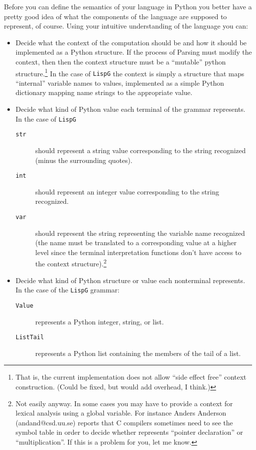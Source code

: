 Before you can define the semantics of your language
in Python you better have a pretty good idea of what
the components of the language are supposed to represent,
of course.  Using your intuitive understanding of the
language you can:
\begin{itemize}
\item
Decide what the context of the computation should be
and how it should be implemented as a Python structure.
If the process of Parsing must modify the context, then
then the context structure must be a ``mutable'' python
structure.\footnote{That is,
the current implementation does not allow ``side effect free''
context construction. (Could be fixed, but would add overhead,
I think.)}
In the case of {\tt LispG} the context is simply a structure
that maps ``internal'' variable names to values,
implemented as a simple Python dictionary mapping
name strings to the appropriate value.
\item
Decide what kind of Python value each terminal of the grammar
represents.  In the case of {\tt LispG}
\begin{description}
\item[\tt str]
should represent a string value corresponding to the string
recognized (minus the surrounding quotes).
\item[\tt int]
should represent an integer value corresponding to the
string recognized.
\item[\tt var]
should represent the string representing the variable name
recognized (the name must be translated to a corresponding
value at a higher level since the terminal interpretation
functions don't have access to the context 
structure).\footnote{Not easily anyway.  In some cases you
may have to provide a context for lexical
analysis using a global variable.  For
instance Anders Anderson (andand@csd.uu.se) reports that C
compilers sometimes need to see the symbol table in order to
decide whether {\tt *} represents ``pointer declaration''
or ``multiplication''.  If this is a problem for you, let
me know.}
\end{description}
\item
Decide what kind of Python structure or value each
nonterminal represents.  In the case of the {\tt LispG}
grammar:
\begin{description}
\item[\tt Value] 
represents a Python integer, string, or list.
\item[\tt ListTail] 
represents a Python list containing the
  members of the tail of a list.
\end{description}

\end{itemize}
